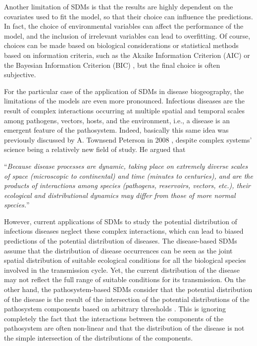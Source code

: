 Another limitation of SDMs is that the results are highly dependent
on the covariates used to fit the model, so that their choice can influence the
predictions. In fact, the choice of environmental variables can affect
the performance of the model, and the inclusion of irrelevant variables can
lead to overfitting. Of course, choices can be made based on biological
considerations or statistical methods based on information criteria, such as
the Akaike Information Criterion (AIC) or the Bayesian Information Criterion
(BIC) \cite{Burnham2002}, but the final choice is often subjective.

For the particular case of the application of SDMs in disease biogeography,
the limitations of the models are even more pronounced. Infectious diseases are
the result of complex interactions occurring at multiple spatial and temporal
scales among pathogens, vectors, hosts, and the environment, i.e., a disease is
an emergent feature of the pathosystem. Indeed, basically this same idea was
previously discussed by A. Townsend Peterson in 2008 \cite{Peterson2008},
despite complex systems' science being a relatively new field of study. He
argued that
\begin{displayquote}
  ``\textit{Because disease processes are dynamic, taking place on extremely
    diverse
    scales of space (microscopic to continental) and time (minutes to
    centuries),
    and are the products of interactions among species (pathogens,
    reservoirs,
    vectors, etc.), their ecological and distributional dynamics may differ
    from
    those of more normal species.}''
\end{displayquote}

However, current applications of  SDMs to study the potential distribution of
infectious diseases neglect these complex interactions, which can lead to
biased predictions of the potential distribution of diseases. The
disease-based
SDMs assume that the distribution of disease occurrences can be seen as the
joint spatial distribution of suitable ecological conditions for all the
biological species involved in the transmission cycle. Yet, the current
distribution of the disease may not reflect the full range of suitable
conditions for its transmission. On the other hand, the pathosystem-based
SDMs
consider that the potential distribution of the disease is the result of the
intersection of the potential distributions of the pathosystem components
based
on arbitrary thresholds \cite{Samy2014,Baak2017,YoonLee2023}. This is
ignoring
completely the fact that the interactions between the components of the
pathosystem are often non-linear and that the distribution of the disease is
not the simple intersection of the distributions of the components.

